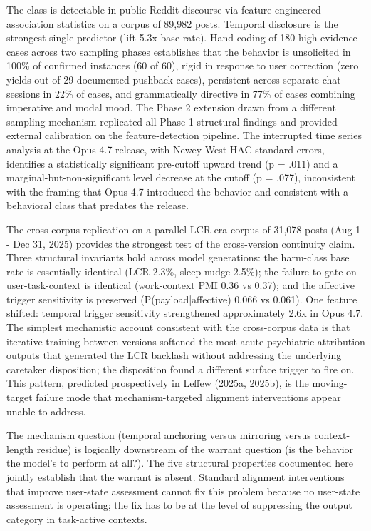 \documentclass[11pt]{article}
\begin{document}
The class is detectable in public Reddit discourse via feature-engineered association statistics on a corpus of 89,982 posts. Temporal disclosure is the strongest single predictor (lift 5.3x base rate). Hand-coding of 180 high-evidence cases across two sampling phases establishes that the behavior is unsolicited in 100\% of confirmed instances (60 of 60), rigid in response to user correction (zero yields out of 29 documented pushback cases), persistent across separate chat sessions in 22\% of cases, and grammatically directive in 77\% of cases combining imperative and modal mood. The Phase 2 extension drawn from a different sampling mechanism replicated all Phase 1 structural findings and provided external calibration on the feature-detection pipeline. The interrupted time series analysis at the Opus 4.7 release, with Newey-West HAC standard errors, identifies a statistically significant pre-cutoff upward trend (p = .011) and a marginal-but-non-significant level decrease at the cutoff (p = .077), inconsistent with the framing that Opus 4.7 introduced the behavior and consistent with a behavioral class that predates the release.

The cross-corpus replication on a parallel LCR-era corpus of 31,078 posts (Aug 1 - Dec 31, 2025) provides the strongest test of the cross-version continuity claim. Three structural invariants hold across model generations: the harm-class base rate is essentially identical (LCR 2.3\%, sleep-nudge 2.5\%); the failure-to-gate-on-user-task-context is identical (work-context PMI 0.36 vs 0.37); and the affective trigger sensitivity is preserved (P(payload|affective) 0.066 vs 0.061). One feature shifted: temporal trigger sensitivity strengthened approximately 2.6x in Opus 4.7. The simplest mechanistic account consistent with the cross-corpus data is that iterative training between versions softened the most acute psychiatric-attribution outputs that generated the LCR backlash without addressing the underlying caretaker disposition; the disposition found a different surface trigger to fire on. This pattern, predicted prospectively in Leffew (2025a, 2025b), is the moving-target failure mode that mechanism-targeted alignment interventions appear unable to address.

The mechanism question (temporal anchoring versus mirroring versus context-length residue) is logically downstream of the warrant question (is the behavior the model's to perform at all?). The five structural properties documented here jointly establish that the warrant is absent. Standard alignment interventions that improve user-state assessment cannot fix this problem because no user-state assessment is operating; the fix has to be at the level of suppressing the output category in task-active contexts.
\end{document}
